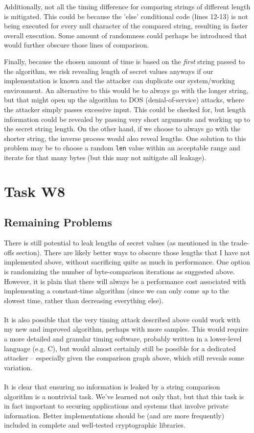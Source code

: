 \documentclass{article}
\providecommand{\inlinecode}{\texttt}
\begin{document}
Additionally, not all the timing difference for comparing strings of different length is mitigated. This could be because the 'else' conditional code (lines 12-13) is not being executed for every null character of the compared string, resulting in faster overall execution. Some amount of randomness could perhaps be introduced that would further obscure those lines of comparison. \par

Finally, because the chosen amount of time is based on the \textit{first} string passed to the algorithm, we risk revealing length of secret values anyways if our implementation is known and the attacker can duplicate our system/working environment.
An alternative to this would be to always go with the longer string, but that might open up the algorithm to DOS (denial-of-service) attacks, where the attacker simply passes excessive input. This could be checked for, but length information could be revealed by passing very short arguments and working up to the secret string length. On the other hand, if we choose to always go with the shorter string, the inverse process would also reveal lengths.
One solution to this problem may be to choose a random \inlinecode{len} value within an acceptable range and iterate for that many bytes (but this may not mitigate all leakage). \\

\section{Task W8}
\subsection{Remaining Problems}
There is still potential to leak lengths of secret values (as mentioned in the trade-offs section). There are likely better ways to obscure those lengths that I have not implemented above, without sacrificing quite as much in performance. One option is randomizing the number of byte-comparison iterations as suggested above. However, it is plain that there will always be a performance cost associated with implementing a constant-time algorithm (since we can only come \textit{up} to the slowest time, rather than decreasing everything else).\\
 \\
It is also possible that the very timing attack described above could work with my new and improved algorithm, perhaps with more samples. This would require a more detailed and granular timing software, probably written in a lower-level language (e.g. C), but would almost certainly still be possible for a dedicated attacker -- especially given the comparison graph above, which still reveals some variation.\\
 \\
It is clear that ensuring no information is leaked by a string comparison algorithm is a nontrivial task. We've learned not only that, but that this task is in fact important to securing applications and systems that involve private information. Better implementations should be (and are more frequently) included in complete and well-tested cryptographic libraries.

\pagebreak

\printbibliography[heading=bibintoc]
\end{document}
